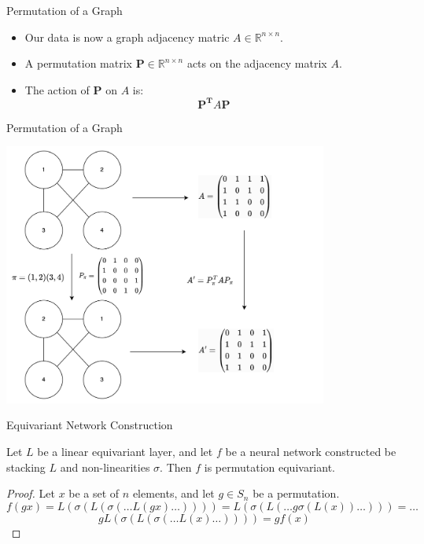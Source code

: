 \documentclass{beamer}
\begin{document}
\begin{frame}{Permutation of a Graph}

    \begin{itemize}
        \setlength{\itemsep}{\fill}
        \item Our data is now a graph adjacency matric $A \in \mathbb{R}^{n \times n}$. 
        \item A permutation matrix $\boldsymbol{P} \in \mathbb{R}^{n \times n}$ acts on the adjacency matrix $A$.
        \item The action of $\boldsymbol{P}$ on $A$ is:
        \[ \boldsymbol{P^T}A\boldsymbol{P} \]
    \end{itemize}
    
\end{frame}
\begin{frame}{Permutation of a Graph}
    \begin{center}
        \includegraphics[width=0.8\textwidth]{../figures/node_permutation.png}
    \end{center}
\end{frame}

\begin{frame}{Equivariant Network Construction}

    \begin{theorem}
        Let $L$ be a linear equivariant layer, and let $f$ be a neural network constructed be stacking $L$ and non-linearities $\sigma$. Then $f$ is permutation equivariant.
    \end{theorem}
    \begin{proof}
        Let $x$ be a set of $n$ elements, and let $g \in S_n$ be a permutation.
        \[ f(gx) = L(\sigma(L(\sigma(\ldots L(gx) \ldots)))) = L(\sigma(L( \ldots g\sigma(L(x)) \ldots))) = \ldots \]
        \[ g L(\sigma(L(\sigma(\ldots L(x) \ldots)))) = gf(x) \]
    \end{proof}
    
    
\end{frame}
\end{document}
